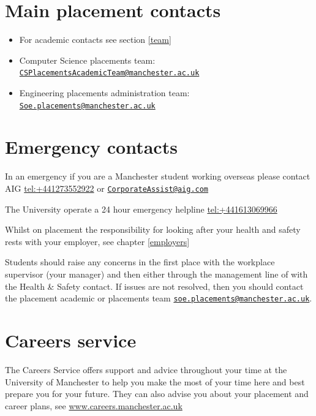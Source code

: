 \documentclass[
]{book}
\providecommand{\tightlist}{%
  \setlength{\itemsep}{0pt}\setlength{\parskip}{0pt}}
\begin{document}
\section{Main placement contacts}\label{main}

\begin{itemize}
\tightlist
\item
  For academic contacts see section \ref{team}
\item
  Computer Science placements team: \href{mailto:CSPlacementsAcademicTeam@manchester.ac.uk}{\nolinkurl{CSPlacementsAcademicTeam@manchester.ac.uk}}
\item
  Engineering placements administration team: \href{mailto:Soe.placements@manchester.ac.uk}{\nolinkurl{Soe.placements@manchester.ac.uk}}
\end{itemize}

\section{Emergency contacts}\label{emergency}

In an emergency if you are a Manchester student working overseas please contact AIG \url{tel:+441273552922} or \href{mailto:CorporateAssist@aig.com}{\nolinkurl{CorporateAssist@aig.com}}

The University operate a 24 hour emergency helpline \url{tel:+441613069966}

Whilst on placement the responsibility for looking after your health and safety rests with your employer, see chapter \ref{employers}

Students should raise any concerns in the first place with the workplace supervisor (your manager) and then either through the management line of with the Health \& Safety contact. If issues are not resolved, then you should contact the placement academic or placements team \href{mailto:soe.placements@manchester.ac.uk}{\nolinkurl{soe.placements@manchester.ac.uk}}.

\section{Careers service}\label{careers}

The Careers Service offers support and advice throughout your time at the University of Manchester to help you make the most of your time here and best prepare you for your future. They can also advise you about your placement and career plans, see \href{https://www.careers.manchester.ac.uk/}{www.careers.manchester.ac.uk} \citep{careers}
\end{document}

